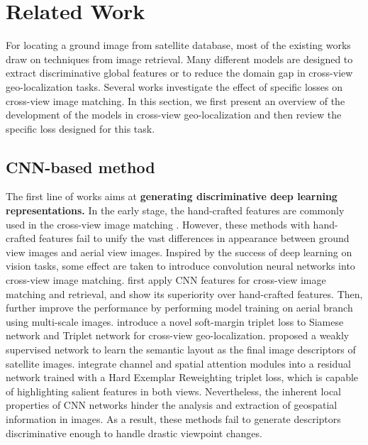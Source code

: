 \documentclass[sn-basic,iicol]{sn-jnl}
\theoremstyle{thmstyletwo}\newtheorem{example}{Example}\newtheorem{remark}{Remark}
\theoremstyle{thmstylethree}\newtheorem{definition}{Definition}
\begin{document}
\section{Related Work}\label{sec2}
For locating a ground image from satellite database, most of the existing works draw on techniques from image retrieval. Many different models are designed to extract discriminative global features or to reduce the domain gap in cross-view geo-localization tasks. Several works investigate the effect of specific losses on cross-view image matching. In this section, we first present an overview of the development of the models in cross-view geo-localization and then review the specific loss designed for this task.

\subsection{CNN-based method}
The first line of works aims at {\bf generating discriminative deep learning representations.} In the early stage, the hand-crafted features are commonly used in the cross-view image matching \citep{bansal2011geo,senlet2011framework,senlet2012satellite, viswanathan2014vision}. However, these methods with hand-crafted features fail to unify the vast differences in appearance between ground view images and aerial view images. Inspired by the success of deep learning on vision tasks, some effect are taken to introduce convolution neural networks into cross-view image matching. \cite{workman2015location} first apply CNN features for cross-view image matching and retrieval, and show its superiority over hand-crafted features. Then, \cite{workman2015wide} further improve the performance by performing model training on aerial branch using multi-scale images. \cite{vo2016localizing} introduce a novel soft-margin triplet loss to Siamese network and Triplet network for cross-view geo-localization. \cite{CVUSA} proposed a weakly supervised network to learn the semantic layout as the final image descriptors of satellite images. \cite{cai2019reweightingloss} integrate channel and spatial attention modules into a residual network trained with a Hard Exemplar Reweighting triplet loss, which is capable of highlighting salient features in both views.  Nevertheless, the inherent local properties of CNN networks hinder the analysis and extraction of geospatial information in images. As a result, these methods fail to generate descriptors discriminative enough to handle drastic viewpoint changes.
\end{document}
